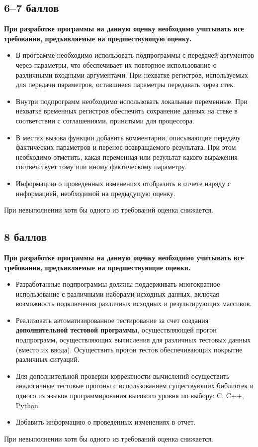 \documentclass[a4paper, 12pt, oneside]{article}
\begin{document}
\subsection*{6--7 баллов}

\textbf{При разработке программы на данную оценку необходимо учитывать все требования, предъявляемые на предшествующую оценку.}

\begin{itemize}
    \item В программе необходимо использовать подпрограммы с передачей аргументов через параметры, что обеспечивает их повторное использование с различными входными аргументами. При нехватке регистров, используемых для передачи параметров, оставшиеся параметры передавать через стек.
    \item Внутри подпрограмм необходимо использовать локальные переменные. При нехватке временных регистров обеспечить сохранение данных на стеке в соответствии с соглашениями, принятыми для процессора.
    \item В местах вызова функции добавить комментарии, описывающие передачу фактических параметров и перенос возвращаемого результата. При этом необходимо отметить, какая переменная или результат какого выражения соответствует тому или иному фактическому параметру.
    \item Информацию о проведенных изменениях отобразить в отчете наряду с информацией, необходимой на предыдущую оценку.
\end{itemize}
При невыполнении хотя бы одного из требований оценка снижается.

\subsection*{8 баллов}

\textbf{При разработке программы на данную оценку необходимо учитывать все требования, предъявляемые на предшествующие оценки.}

\begin{itemize}
    \item Разработанные подпрограммы должны поддерживать многократное использование с различными наборами исходных данных, включая возможность подключения различных исходных и результирующих массивов.
    \item Реализовать автоматизированное тестирование за счет создания \textbf{дополнительной тестовой программы}, осуществляющей прогон подпрограмм, осуществляющих вычисления для различных тестовых данных (вместо их ввода). Осуществить прогон тестов обеспечивающих покрытие различных ситуаций.
    \item Для дополнительной проверки корректности вычислений осуществить аналогичные тестовые прогоны с использованием существующих библиотек и одного из языков программирования высокого уровня по выбору: C, C++, Python.
    \item Добавить информацию о проведенных изменениях в отчет.
\end{itemize}
При невыполнении хотя бы одного из требований оценка снижается.
\end{document}
